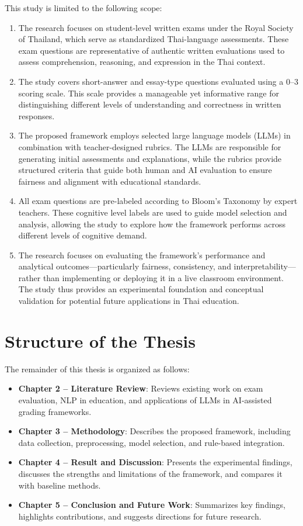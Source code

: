 This study is limited to the following scope:
\begin{enumerate}
    \item The research focuses on student-level written exams under the Royal Society of Thailand, which serve as standardized Thai-language assessments. These exam questions are representative of authentic written evaluations used to assess comprehension, reasoning, and expression in the Thai context.
    \item The study covers short-answer and essay-type questions evaluated using a 0–3 scoring scale. This scale provides a manageable yet informative range for distinguishing different levels of understanding and correctness in written responses.
    \item The proposed framework employs selected large language models (LLMs) in combination with teacher-designed rubrics. The LLMs are responsible for generating initial assessments and explanations, while the rubrics provide structured criteria that guide both human and AI evaluation to ensure fairness and alignment with educational standards.
    \item All exam questions are pre-labeled according to Bloom’s Taxonomy by expert teachers. These cognitive level labels are used to guide model selection and analysis, allowing the study to explore how the framework performs across different levels of cognitive demand.
    \item The research focuses on evaluating the framework’s performance and analytical outcomes—particularly fairness, consistency, and interpretability—rather than implementing or deploying it in a live classroom environment. The study thus provides an experimental foundation and conceptual validation for potential future applications in Thai education.
\end{enumerate}

\section{Structure of the Thesis}

The remainder of this thesis is organized as follows:
\begin{itemize}
    \item \textbf{Chapter 2 – Literature Review}: Reviews existing work on exam evaluation, NLP in education, and applications of LLMs in AI-assisted grading frameworks.
    \item \textbf{Chapter 3 – Methodology}: Describes the proposed framework, including data collection, preprocessing, model selection, and rule-based integration.
    \item \textbf{Chapter 4 – Result and Discussion}: Presents the experimental findings, discusses the strengths and limitations of the framework, and compares it with baseline methods.
    \item \textbf{Chapter 5 – Conclusion and Future Work}: Summarizes key findings, highlights contributions, and suggests directions for future research.
\end{itemize}